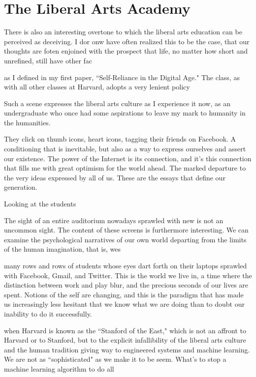 \documentclass[12pt,letterpaper]{article}
\begin{document}
\section{The Liberal Arts Academy}

There is also an interesting overtone to which the liberal arts education can be perceived as deceiving.  I dor onw have often realized this to be the case, that our thoughts are foten enjoined with the prospect that life, no matter how short and unrefined, still  have other fac

as I defined in my first paper, ``Self-Reliance in the Digital Age."  The class, as with all other classes at Harvard, adopts a very lenient policy

Such a scene expresses the liberal arts culture as I experience it now, as an undergraduate who once had some aspirations to leave my mark to humanity in the humanities.   



They click on thumb icons, heart icons, tagging their friends on Facebook.  A conditioning that is inevitable, but also as a way to express ourselves and assert our existence.  The power of the Internet is its connection, and it's this connection that fills me with great optimism for the world ahead.  The marked departure to the very ideas expressed by all of us.  These are the essays that define our generation.

Looking at the students 

The sight of an entire auditorium nowadays sprawled with new is not an uncommon sight.  The content of these screens is furthermore interesting.  We can examine the psychological narratives of our own world departing from the limits of the human imagination, that is, wes

 many rows and rows of students whose eyes dart forth on their laptops sprawled with Facebook, Gmail, and Twitter.  This is the world we live in, a time where the distinction between work and play blur, and the precious seconds of our lives are spent.  Notions of the self are changing, and this is the paradigm that has made us increasingly less hesitant that we know what we are doing than to doubt our inability to do it successfully.

when Harvard is known as the ``Stanford of the East," which is not an affront to Harvard or to Stanford, but to the explicit infallibility of the liberal arts culture and the human tradition giving way to engineered systems and machine learning.  We are not as ``sophisticated" as we make it to be seem.  What's to stop a machine learning algorithm to do all
\end{document}
